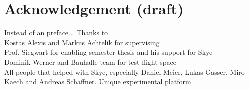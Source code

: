 \section{Acknowledgement (draft)}

Instead of an preface...
Thanks to \\
Kostas Alexis and Markus Achtelik for supervising \\
Prof. Siegwart for enabling semester thesis and his support for Skye \\
Dominik Werner and Bauhalle team for test flight space \\
All people that helped with Skye, especially Daniel Meier, Lukas Gasser, Miro Kaech and Andreas Schaffner. Unique experimental platform.